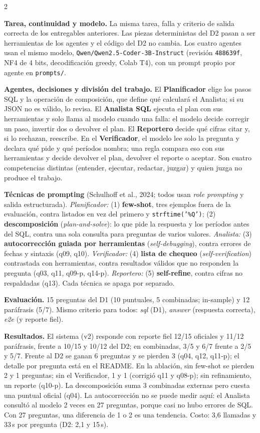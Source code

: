 \documentclass[10pt]{article}
\newcommand{\head}[1]{\textbf{\color{ucblue}#1}\hspace{0.4em}}
\begin{document}
\begin{multicols}{2}
\small

\head{Tarea, continuidad y modelo.} La misma tarea, falla y criterio de salida correcta de los
entregables anteriores. Las piezas deterministas del D2 pasan a ser herramientas de los
agentes y el código del D2 no cambia. Los cuatro agentes usan el mismo modelo, \texttt{Qwen/Qwen2.5-Coder-3B-Instruct} (revisión \texttt{488639f}, NF4 de
4 bits, decodificación greedy, Colab T4), con un prompt propio por agente en \texttt{prompts/}.

\head{Agentes, decisiones y división del trabajo.} El \textbf{Planificador} elige los pasos SQL y
la operación de composición, que define qué calculará el Analista; si su JSON no es válido, lo revisa.
El \textbf{Analista SQL} ejecuta el plan con sus herramientas y solo llama al modelo cuando una
falla: el modelo decide corregir un paso, invertir dos o devolver el plan. El \textbf{Reportero}
decide qué cifras citar y, si lo rechazan, reescribe. En el \textbf{Verificador}, el modelo lee solo
la pregunta y declara qué pide y qué períodos nombra; una regla compara eso con sus herramientas y
decide devolver el plan, devolver el reporte o aceptar. Son cuatro competencias distintas (entender,
ejecutar, redactar, juzgar) y quien juzga no produce el trabajo.

\head{Técnicas de prompting} (Schulhoff et al., 2024; todos usan \textit{role prompting} y salida
estructurada). \textit{Planificador:} (1) \textbf{few-shot}, tres ejemplos fuera de la evaluación,
contra listados en vez del primero y \texttt{strftime('\%Q')}; (2) \textbf{descomposición}
(\textit{plan-and-solve}): lo que pide la respuesta y los períodos antes del SQL, contra una sola
consulta para preguntas de varios valores. \textit{Analista:} (3) \textbf{autocorrección guiada por
herramientas} (\textit{self-debugging}), contra errores de fechas y sintaxis (q09, q10).
\textit{Verificador:} (4) \textbf{lista de chequeo} (\textit{self-verification}) contrastada con
herramientas, contra resultados válidos que no responden la pregunta (q03, q11, q09-p, q14-p).
\textit{Reportero:} (5) \textbf{self-refine}, contra cifras no respaldadas (q13). Cada técnica se
apaga por separado.

\head{Evaluación.} 15 preguntas del D1 (10 puntuales, 5 combinadas; in-sample) y 12 paráfrasis
(5/7). Mismo criterio para todos: \textit{sql} (D1), \textit{answer} (respuesta correcta),
\textit{e2e} (y reporte fiel).

\head{Resultados.} El sistema (v2) responde con reporte fiel 12/15 oficiales y 11/12
paráfrasis, frente a 10/15 y 10/12 del D2; en combinadas, 3/5 y 6/7 frente a 2/5 y 5/7. Frente
al D2 se ganan 6 preguntas y se pierden 3 (q04, q12, q11-p); el detalle por pregunta está en el
README. En la
ablación, sin few-shot se pierden 2 y 1 preguntas; sin el Verificador, 1 y 1 (corrigió q11 y
q08-p); sin refinamiento, un reporte (q10-p). La descomposición suma 3 combinadas externas pero
cuesta una puntual oficial (q04). La autocorrección no se puede medir aquí: el Analista consultó
al modelo 2 veces en 27 preguntas, porque casi no hubo errores de SQL. Con 27 preguntas, una
diferencia de 1 o 2 es una tendencia. Costo: 3,6 llamadas y 33\,s por pregunta (D2: 2,1 y 15\,s).


\end{multicols}
\end{document}
